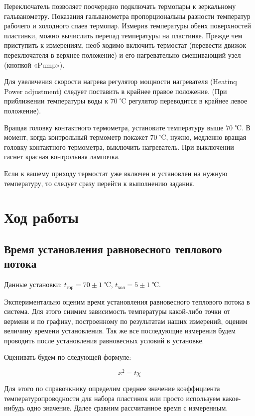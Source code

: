 \documentclass[a4paper,11.5pt]{article} %
\begin{document}
Переключатель позволяет поочередно подключать термопары к зеркальному гальванометру. Показания гальванометра пропорциональны разности температур рабочего и холодного спаев термопар. Измерив температуры обеих поверхностей пластинки, можно вычислить перепад температуры на пластинке. Прежде чем приступить к измерениям, необ ходимо включить термостат (перевести движок переключателя в верхнее положение) и его нагревательно-смешивающий узел (кнопкой «Pump»).

Для увеличения скорости нагрева регулятор мощности нагревателя (Heatinq
Power adjustment) следует поставить в крайнее правое положение. (При приближении температуры воды к 70 ℃ регулятор переводится в крайнее левое положение).

Вращая головку контактного термометра, установите температуру выше 70 ℃. В момент, когда контрольный термометр покажет 70 ℃, нужно, медленно вращая головку контактного термометра, выключить нагреватель. При выключении гаснет красная контрольная лампочка.

Если к вашему приходу термостат уже включен и установлен на нужную температуру, то следует сразу перейти к выполнению задания.

\section{Ход работы}

\subsection{Время установления равновесного теплового потока}

Данные установки: $t_{\text{гор}} = 70 \pm 1$ ℃, $t_{\text{хол}} = 5 \pm 1$ ℃.

Экспериментально оценим время установления равновесного теплового потока в система. Для этого снимим зависимость температуры какой-либо точки от вермени и по графику, построенному по результатам наших измерений, оценим величину времени установления. Так же все последующие измерения будем проводить после установления равновесных условий в установке.

Оценивать будем по следующей формуле:

\begin{equation}
	x^2 = t \chi
	\label{prob:1}
\end{equation}

Для этого по справочкнику определим среднее значение коэффициента температуропроводности для набора пластинок или просто используем какое-нибудь одно значение. Далее сравним рассчитанное время с измеренным.
\end{document}
